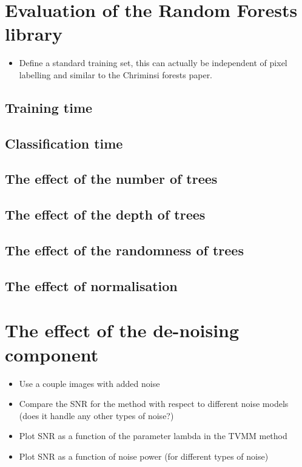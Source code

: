 \documentclass[12pt,twoside,notitlepage]{report}
\begin{document}
    \section{Evaluation of the Random Forests library}
        \begin{itemize}
            \item Define a standard training set, this can actually be independent of pixel labelling and similar to the Chriminsi forests paper.
        \end{itemize}

        \subsection{Training time}
        \subsection{Classification time}
        \subsection{The effect of the number of trees}
        \subsection{The effect of the depth of trees}
        \subsection{The effect of the randomness of trees}
        \subsection{The effect of normalisation} \label{sec:effect_of_normalisation}


    \section{The effect of the de-noising component}
        \begin{itemize}
            \item Use a couple images with added noise
            \item Compare the SNR for the method with respect to different noise models (does it handle any other types of noise?)
            \item Plot SNR as a function of the parameter lambda in the TVMM method
            \item Plot SNR as a function of noise power (for different types of noise)
        \end{itemize}
\end{document}
